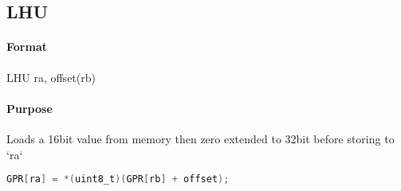 \subsection{LHU}


\paragraph{Format} LHU ra, offset(rb)

\paragraph{Purpose} Loads a 16bit value from memory then zero extended to 32bit before storing to `ra`

\begin{lstlisting}[language=C]
    GPR[ra] = *(uint8_t)(GPR[rb] + offset);
\end{lstlisting}